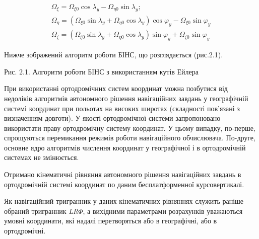 \[\begin{array}{l} 
{\Omega_{\xi } =\Omega_{\xi 0} \cos \lambda_{y} -\Omega_{\eta 0} \sin \lambda 
_{y} ;} \\ {\Omega_{\eta } =(\Omega_{\xi 0} \sin \lambda_{y} +\Omega_{\eta 0} 
\cos \lambda_{y} )\cos \varphi_{y} -\Omega_{\xi 0} \sin \varphi_{y} } \\ {\Omega 
_{\zeta } =(\Omega_{\xi 0} \sin \lambda_{y} +\Omega_{\eta 0} \cos \lambda_{y} 
)\sin \varphi_{y} +\Omega_{\zeta 0} \sin \varphi_{y} } \end{array}\] 



Нижче зображений алгоритм роботи БІНС, що розглядається (рис.2.1).

\eject 





Рис. 2.1. Алгоритм роботи БІНС з використанням кутів Ейлера



\textbf{}


При використанні ортодромічних систем координат можна позбутися від недоліків  алгоритмів 
автономного рішення навігаційних завдань у географічній системі координат при польотах 
на високих широтах (складності пов'язані з визначенням довготи). У якості ортодромічної 
системи запропоновано використати праву ортодромічну систему координат. У цьому випадку, 
по-перше, спрощуються перемикання режимів роботи навігаційного обчислювача. По-друге, 
основне ядро алгоритмів числення координат у географічної і в ортодромічній системах 
не змінюється. 

Отримано кінематичні рівняння автономного рішення навігаційних завдань в ортодромічній 
системі координат по даним бесплатформенної курсовертикалі. 

Як навігаційний тригранник у даних кінематичних рівняннях служить раніше обраний 
тригранник \textit{LR$\Phi $}, а \textit{ }вихідними параметрами розрахунків уважаються 
умовні координати, які надалі перетворяться  або в географічні, або в ортодромічні. 


